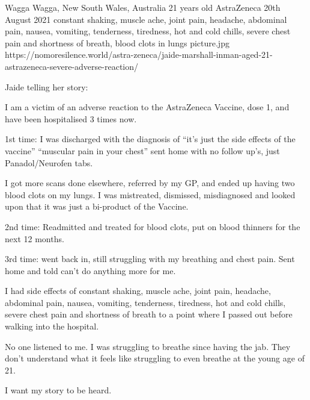 {Wagga Wagga, New South Wales, Australia}
{21 years old}
{AstraZeneca}
{20th August 2021}
{constant shaking, muscle ache, joint pain, headache, abdominal pain, nausea,
  vomiting, tenderness, tiredness, hot and cold chills, severe chest pain and
  shortness of breath, blood clots in lungs}
{picture.jpg}
{https://nomoresilence.world/astra-zeneca/jaide-marshall-inman-aged-21-astrazeneca-severe-adverse-reaction/}
{

Jaide telling her story:

I am a victim of an adverse reaction to the AstraZeneca Vaccine, dose 1, and
have been hospitalised 3 times now.

1st time: I was discharged with the diagnosis of “it’s just the side effects of
the vaccine” “muscular pain in your chest” sent home with no follow up’s, just
Panadol/Neurofen tabs.

I got more scans done elsewhere, referred by my GP, and ended up having two
blood clots on my lungs. I was mistreated, dismissed, misdiagnosed and looked
upon that it was just a bi-product of the Vaccine.

2nd time: Readmitted and treated for blood clots, put on blood thinners for the
next 12 months.

3rd time: went back in, still struggling with my breathing and chest pain. Sent
home and told can’t do anything more for me.

I had side effects of constant shaking, muscle ache, joint pain, headache,
abdominal pain, nausea, vomiting, tenderness, tiredness, hot and cold chills,
severe chest pain and shortness of breath to a point where I passed out before
walking into the hospital.

No one listened to me. I was struggling to breathe since having the jab. They
don’t understand what it feels like struggling to even breathe at the young age
of 21.

I want my story to be heard.

}
